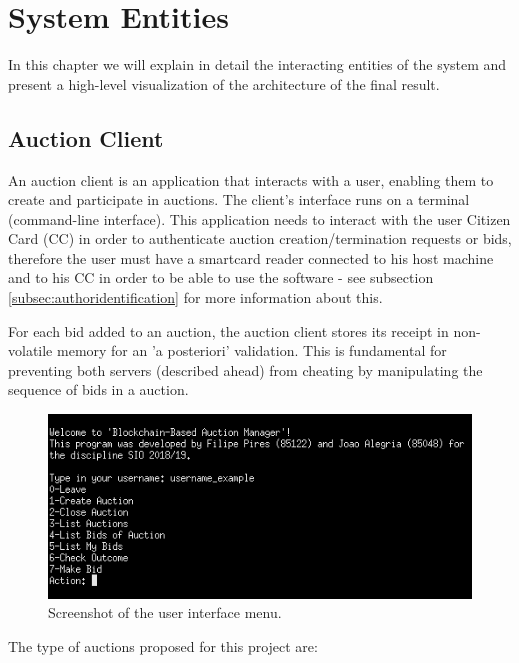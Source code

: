 \documentclass[a4paper]{article}
\begin{document}
\newpage
\section{System Entities} %
\label{sec:systementities}

In this chapter we will explain in detail the interacting entities of the system and present a high-level visualization of the architecture of the final result.

\subsection{Auction Client}

An auction client is an application that interacts with a user, enabling them to create and participate in auctions. 
The client's interface runs on a terminal (command-line interface).
This application needs to interact with the user Citizen Card (CC) in order to authenticate auction creation/termination requests or bids, therefore the user must have a smartcard reader connected to his host machine and to his CC in order to be able to use the software - see subsection \ref{subsec:authoridentification} for more information about this.

For each bid added to an auction, the auction client stores its receipt in non-volatile memory for an 'a posteriori' validation. 
This is fundamental for preventing both servers (described ahead) from cheating by manipulating the sequence of bids in a auction.

\begin{figure}[H]
\centering
\includegraphics[width=0.8\linewidth]{UI.png}
\caption{Screenshot of the user interface menu.}
\label{fig:ui}
\end{figure}

The type of auctions proposed for this project are: 
\end{document}
